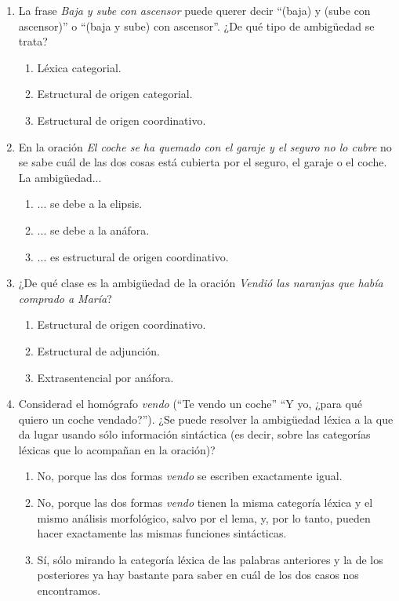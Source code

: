 \begin{enumerate}
\item La frase \emph{Baja y sube con ascensor} puede querer decir ``(baja) y (sube con ascensor)'' o ``(baja y sube) con ascensor''. ¿De qué tipo de ambigüedad se trata? \begin{enumerate} \item Léxica categorial. \item Estructural de origen categorial. \item Estructural de origen coordinativo. \end{enumerate} 

\item En la oración \emph{El coche se ha quemado con el garaje y el seguro no lo cubre} no se sabe cuál de las dos cosas está cubierta por el seguro, el garaje o el coche. La ambigüedad... \begin{enumerate} \item ... se debe a la elipsis. \item ... se debe a la anáfora. \item ... es estructural de origen coordinativo. \end{enumerate} 

\item ¿De qué clase es la ambigüedad de la oración \emph{Vendió las naranjas que había comprado a María}? \begin{enumerate} \item Estructural de origen coordinativo. \item Estructural de adjunción. \item Extrasentencial por anáfora. \end{enumerate} 

\item Considerad el homógrafo \emph{vendo} (``Te vendo un coche'' ``Y yo, ¿para qué quiero un coche vendado?''). ¿Se puede resolver la ambigüedad léxica a la que da lugar usando sólo información sintáctica (es decir, sobre las categorías léxicas que lo acompañan en la oración)? \begin{enumerate} \item No, porque las dos formas \emph{vendo} se escriben exactamente igual. \item No, porque las dos formas \emph{vendo} tienen la misma categoría léxica y el mismo análisis morfológico, salvo por el lema, y, por lo tanto, pueden hacer exactamente las mismas funciones sintácticas. \item Sí, sólo mirando la categoría léxica de las palabras anteriores y la de los posteriores ya hay bastante para saber en cuál de los dos casos nos encontramos. \end{enumerate} 


\end{enumerate}
